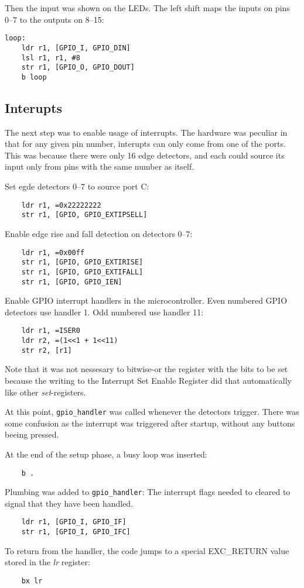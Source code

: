 Then the input was shown on the LEDs.
The left shift maps the inputs on pins 0--7 to the outputs on 8--15:
\begin{verbatim}
loop:
    ldr r1, [GPIO_I, GPIO_DIN]
    lsl r1, r1, #8
    str r1, [GPIO_O, GPIO_DOUT]
    b loop
\end{verbatim}


\subsection{Interupts}
The next step was to enable usage of interrupts.
The hardware was peculiar in that for any given pin number, interupts can only come from one of the ports.
This was because there were only 16 edge detectors, and each could source its input only from pins with the same number as itself.

Set egde detectors 0--7 to source port C:
\begin{verbatim}
    ldr r1, =0x22222222
    str r1, [GPIO, GPIO_EXTIPSELL]
\end{verbatim}

Enable edge rise and fall detection on detectors 0--7:
\begin{verbatim}
    ldr r1, =0x00ff
    str r1, [GPIO, GPIO_EXTIRISE]
    str r1, [GPIO, GPIO_EXTIFALL]
    str r1, [GPIO, GPIO_IEN]
\end{verbatim}

Enable GPIO interrupt handlers in the microcontroller.
Even numbered GPIO detectors use handler 1.
Odd numbered use handler 11:
\begin{verbatim}
    ldr r1, =ISER0
    ldr r2, =(1<<1 + 1<<11)
    str r2, [r1]
\end{verbatim}

Note that it was not nessesary to bitwise-or the register with the bits to be set because the writing to the Interrupt Set Enable Register did that automatically like other \emph{set}-registers.

At this point, \texttt{gpio\_handler} was called whenever the detectors trigger.
There was some confusion as the interrupt was triggered after startup, without any buttons beeing pressed.

At the end of the setup phase, a busy loop was inserted:
\begin{verbatim}
    b .
\end{verbatim}

Plumbing was added to \texttt{gpio\_handler}:
The interrupt flags needed to cleared to signal that they have been handled.
\begin{verbatim}
    ldr r1, [GPIO_I, GPIO_IF]
    str r1, [GPIO_I, GPIO_IFC]
\end{verbatim}

To return from the handler, the code jumps to a special EXC\_RETURN value stored in the \emph{lr} register:

\begin{verbatim}
    bx lr
\end{verbatim}
